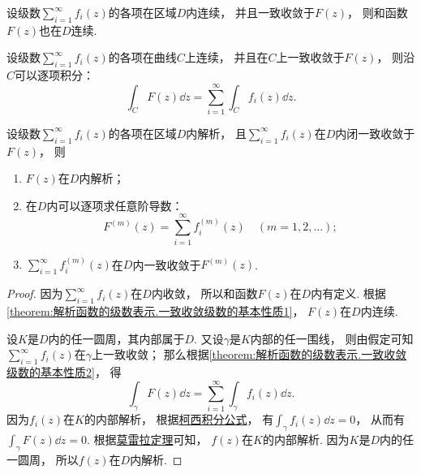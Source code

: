 \begin{theorem}\label{theorem:解析函数的级数表示.一致收敛级数的基本性质1}
设级数\(\sum_{i=1}^\infty f_i(z)\)的各项在区域\(D\)内连续，
并且一致收敛于\(F(z)\)，
则和函数\(F(z)\)也在\(D\)连续.
\end{theorem}

\begin{theorem}\label{theorem:解析函数的级数表示.一致收敛级数的基本性质2}
设级数\(\sum_{i=1}^\infty f_i(z)\)的各项在曲线\(C\)上连续，
并且在\(C\)上一致收敛于\(F(z)\)，
则沿\(C\)可以逐项积分：\[
	\int_C F(z) \dd{z}
	= \sum_{i=1}^\infty \int_C f_i(z) \dd{z}.
\]
\end{theorem}

\begin{theorem}[魏尔斯特拉斯定理]\label{theorem:解析函数的级数表示.魏尔斯特拉斯定理}
设级数\(\sum_{i=1}^\infty f_i(z)\)的各项在区域\(D\)内解析，
且\(\sum_{i=1}^\infty f_i(z)\)在\(D\)内闭一致收敛于\(F(z)\)，
则\begin{enumerate}
	\item \(F(z)\)在\(D\)内解析；

	\item 在\(D\)内可以逐项求任意阶导数：\[
		F^{(m)}(z) = \sum_{i=1}^\infty f_i^{(m)}(z)
		\quad(m=1,2,\dotsc);
	\]

	\item \(\sum_{i=1}^\infty f_i^{(m)}(z)\)在\(D\)内一致收敛于\(F^{(m)}(z)\).
\end{enumerate}
\begin{proof}
因为\(\sum_{i=1}^\infty f_i(z)\)在\(D\)内收敛，
所以和函数\(F(z)\)在\(D\)内有定义.
根据\cref{theorem:解析函数的级数表示.一致收敛级数的基本性质1}，
\(F(z)\)在\(D\)内连续.

设\(K\)是\(D\)内的任一圆周，其内部属于\(D\).
又设\(\gamma\)是\(K\)内部的任一围线，
则由假定可知\(\sum_{i=1}^\infty f_i(z)\)在\(\gamma\)上一致收敛；
那么根据\cref{theorem:解析函数的级数表示.一致收敛级数的基本性质2}，
得\[
	\int_\gamma F(z) \dd{z} = \sum_{i=1}^\infty \int_\gamma f_i(z) \dd{z}.
\]
因为\(f_i(z)\)在\(K\)的内部解析，
根据\hyperref[equation:解析函数的积分表示.柯西积分公式]{柯西积分公式}，
有\(\int_\gamma f_i(z) \dd{z} = 0\)，
从而有\(\int_\gamma F(z) \dd{z} = 0\).
根据\hyperref[theorem:解析函数的积分表示.莫雷拉定理]{莫雷拉定理}可知，
\(f(z)\)在\(K\)的内部解析.
因为\(K\)是\(D\)内的任一圆周，
所以\(f(z)\)在\(D\)内解析.


\end{proof}
\end{theorem}

